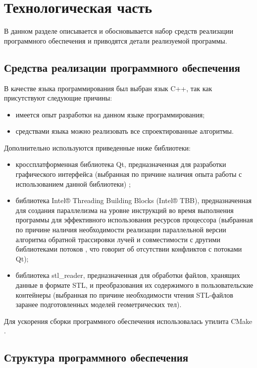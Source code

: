 \chapter{Технологическая часть}

В данном разделе описывается и обосновывается набор средств реализации программного обеспечения и приводятся детали реализуемой программы.

\section{Средства реализации программного обеспечения}

В качестве языка программирования был выбран язык C++, так как присутствуют следующие причины:

\begin{itemize}
	\item имеется опыт разработки на данном языке программирования;
	\item средствами языка можно реализовать все спроектированные алгоритмы.
\end{itemize}

Дополнительно используются приведенные ниже библиотеки:

\begin{itemize}
	\item кроссплатформенная библиотека Qt, предназначенная для разработки графического интерфейса (выбранная по причине наличия опыта работы с использованием данной библиотеки) \cite{qt};
	\item библиотека Intel® Threading Building Blocks (Intel® TBB), предназначенная для создания параллелизма на уровне инструкций во время выполнения программы для эффективного использования ресурсов процессора \cite{inteltbb} (выбранная по причине наличия необходимости реализации параллельной версии алгоритма обратной трассировки лучей и совместимости с другими библиотеками потоков \cite{inteltbb}, что говорит об отсутствии конфликтов с потоками Qt);
	\item библиотека stl\_reader, предназначенная для обработки файлов, хранящих данные в формате STL, и преобразования их содержимого в пользовательские контейнеры \cite{stlreader} (выбранная по причине необходимости чтения STL-файлов заранее подготовленных моделей геометрических тел).
\end{itemize}

Для ускорения сборки программного обеспечения использовалась утилита CMake \cite{cmake}.

\section{Структура программного обеспечения}

